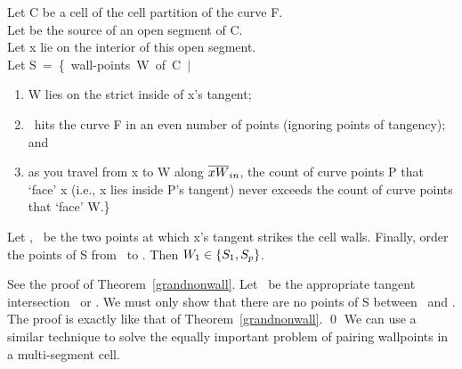 \begin{theorem}\nopagebreak
\label{extension}
Let C be a cell of the cell partition of the curve F.\\
Let \wone be the source of an open segment of C.\\
Let x lie on the interior of this open segment.\\
Let \mbox{S = \{ wall-points W of C $\mid$ }
\begin{enumerate}
	\item W lies on the strict inside of x's tangent;
	\item {}\ hits the curve F in an even number of points (ignoring
points of tangency); and
	\item as you travel from x to W along $\mbox{$\overline{xW}$}_{in}$,
the count of curve points P that `face' x (i.e., x lies inside P's
tangent) never exceeds the count of curve points that `face' W.\}
\end{enumerate}
Let \xone, \xtwo\ be the two points at which x's tangent strikes the cell 
walls.
Finally, order the points of S from \xone\ to \xtwo.
Then $\mbox{$W_{1}$} \in \{S_{1},S_{p}\} $.
\end{theorem}
\proof
See the proof of Theorem~\ref{grandnonwall}.
Let \wtwo\ be the appropriate tangent intersection \xone\ or \xtwo.
We must only show that there are no points of S between \xone\ and \wone.
The proof is exactly like that of Theorem~\ref{grandnonwall}.
\qed
We can use a similar technique to solve the equally important problem of
pairing wallpoints in a multi-segment cell.
